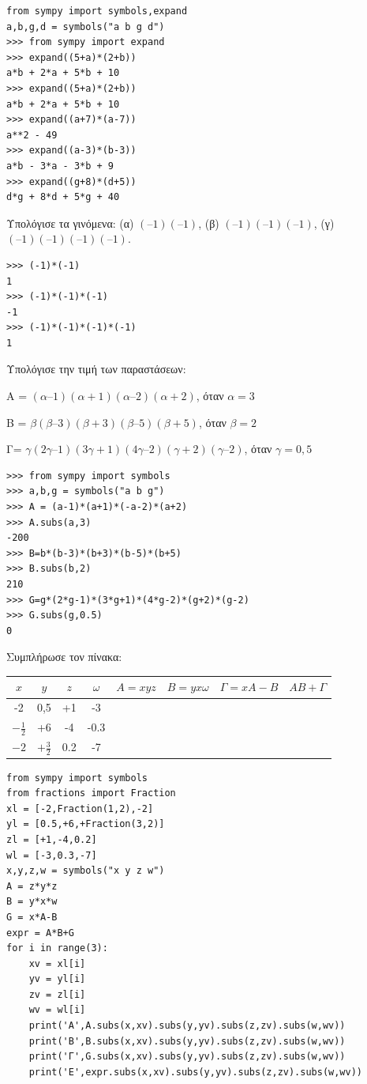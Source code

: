 \begin{lstlisting}
from sympy import symbols,expand
a,b,g,d = symbols("a b g d")
>>> from sympy import expand
>>> expand((5+a)*(2+b))
a*b + 2*a + 5*b + 10
>>> expand((5+a)*(2+b))
a*b + 2*a + 5*b + 10
>>> expand((a+7)*(a-7))
a**2 - 49
>>> expand((a-3)*(b-3))
a*b - 3*a - 3*b + 9
>>> expand((g+8)*(d+5))
d*g + 8*d + 5*g + 40
\end{lstlisting}
\begin{exercise}
Υπολόγισε τα  γινόμενα: (α) $(–1)(–1)$,   (β) $(–1)(–1)(–1)$,   (γ) $(–1)(–1)(–1)(–1)$.
\end{exercise}
\begin{lstlisting}
>>> (-1)*(-1)
1
>>> (-1)*(-1)*(-1)
-1
>>> (-1)*(-1)*(-1)*(-1)
1
\end{lstlisting}
\begin{exercise}
Υπολόγισε την τιμή  των παραστάσεων:

A = $(\alpha–1)(\alpha+1)(\alpha–2)(\alpha+2)$,      όταν $\alpha = 3$

B = $\beta(\beta–3)(\beta+3)(\beta–5)(\beta+5)$,       όταν $\beta  = 2$

Γ=  $\gamma(2\gamma–1)(3\gamma+1)(4\gamma–2)(\gamma+2)(\gamma–2)$,     όταν $\gamma=0,5$

\end{exercise}
\begin{lstlisting}
>>> from sympy import symbols
>>> a,b,g = symbols("a b g")
>>> A = (a-1)*(a+1)*(-a-2)*(a+2)
>>> A.subs(a,3)
-200
>>> B=b*(b-3)*(b+3)*(b-5)*(b+5)
>>> B.subs(b,2)
210
>>> G=g*(2*g-1)*(3*g+1)*(4*g-2)*(g+2)*(g-2)
>>> G.subs(g,0.5)
0
\end{lstlisting}
\begin{exercise}
Συμπλήρωσε  τον πίνακα:
\begin{table}[h]
\begin{tabular}{|c|c|c|c|c|c|c|c|}
$x$&$y$&$z$&$\omega$&$A=xyz$&$B=yx\omega$&$\Gamma=xA-B$&$AB+\Gamma$\\\hline
-2& 0,5& +1& -3&&&&\\\hline
$-\frac{1}{2}$&+6&-4&-0.3&&&&\\\hline
$-2$&$+\frac{3}{2}$&0.2&-7&&&&\\\hline
\end{tabular}
\end{table}
\end{exercise}
\begin{lstlisting}
from sympy import symbols
from fractions import Fraction
xl = [-2,Fraction(1,2),-2]
yl = [0.5,+6,+Fraction(3,2)]
zl = [+1,-4,0.2]
wl = [-3,0.3,-7]
x,y,z,w = symbols("x y z w")
A = z*y*z
B = y*x*w
G = x*A-B
expr = A*B+G
for i in range(3):
    xv = xl[i]
    yv = yl[i]
    zv = zl[i]
    wv = wl[i]
    print('A',A.subs(x,xv).subs(y,yv).subs(z,zv).subs(w,wv))
    print('B',B.subs(x,xv).subs(y,yv).subs(z,zv).subs(w,wv))
    print('Γ',G.subs(x,xv).subs(y,yv).subs(z,zv).subs(w,wv))
    print('Ε',expr.subs(x,xv).subs(y,yv).subs(z,zv).subs(w,wv))
\end{lstlisting}
